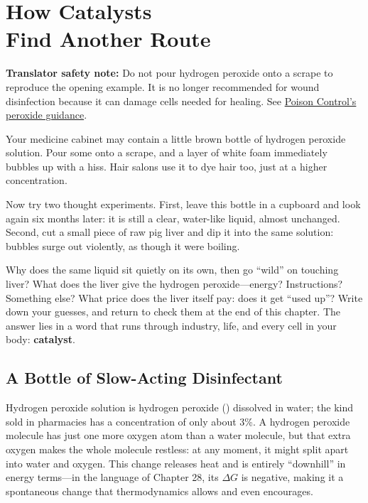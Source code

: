 \chapter[How Catalysts Find Another Route]{How Catalysts\protect\\ Find Another Route}

\begin{kaichang}
\textbf{Translator safety note:} Do not pour hydrogen peroxide onto a scrape to reproduce the opening example. It is no longer recommended for wound disinfection because it can damage cells needed for healing. See \href{https://www.poison.org/articles/hydrogen-peroxide}{Poison Control's peroxide guidance}.

Your medicine cabinet may contain a little brown bottle of hydrogen peroxide solution. Pour some onto a scrape, and a layer of white foam immediately bubbles up with a hiss. Hair salons use it to dye hair too, just at a higher concentration.

Now try two thought experiments. First, leave this bottle in a cupboard and look again six months later: it is still a clear, water-like liquid, almost unchanged. Second, cut a small piece of raw pig liver and dip it into the same solution: bubbles surge out violently, as though it were boiling.

Why does the same liquid sit quietly on its own, then go ``wild'' on touching liver? What does the liver give the hydrogen peroxide---energy? Instructions? Something else? What price does the liver itself pay: does it get ``used up''? Write down your guesses, and return to check them at the end of this chapter. The answer lies in a word that runs through industry, life, and every cell in your body: \textbf{catalyst}.
\end{kaichang}

\section{A Bottle of Slow-Acting Disinfectant}

Hydrogen peroxide solution is hydrogen peroxide () dissolved in water; the kind sold in pharmacies has a concentration of only about 3\%. A hydrogen peroxide molecule has just one more oxygen atom than a water molecule, but that extra oxygen makes the whole molecule restless: at any moment, it might split apart into water and oxygen. This change releases heat and is entirely ``downhill'' in energy terms---in the language of Chapter 28, its $\Delta G$ is negative, making it a spontaneous change that thermodynamics allows and even encourages.

